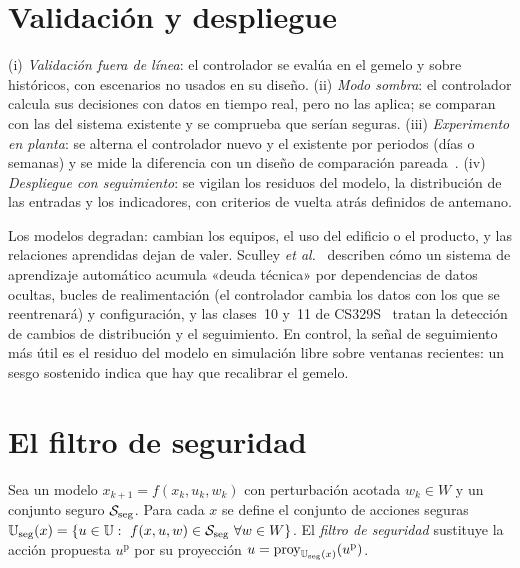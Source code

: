 \section{Validación y despliegue}

\begin{definicion}\label{def:validar}
(i) \emph{Validación fuera de línea}: el controlador se evalúa en el gemelo y sobre históricos, con escenarios no usados en su diseño. (ii) \emph{Modo sombra}: el controlador calcula sus decisiones con datos en tiempo real, pero no las aplica; se comparan con las del sistema existente y se comprueba que serían seguras. (iii) \emph{Experimento en planta}: se alterna el controlador nuevo y el existente por periodos (días o semanas) y se mide la diferencia con un diseño de comparación pareada~\cite[cap.~2]{montgomery}. (iv) \emph{Despliegue con seguimiento}: se vigilan los residuos del modelo, la distribución de las entradas y los indicadores, con criterios de vuelta atrás definidos de antemano.
\end{definicion}

\addtocounter{definicion}{1}%

Los modelos degradan: cambian los equipos, el uso del edificio o el producto, y las relaciones aprendidas dejan de valer. Sculley \emph{et al.}~\cite{sculley} describen cómo un sistema de aprendizaje automático acumula «deuda técnica» por dependencias de datos ocultas, bucles de realimentación (el controlador cambia los datos con los que se reentrenará) y configuración, y las clases~10 y~11 de CS329S~\cite{cs329s} tratan la detección de cambios de distribución y el seguimiento. En control, la señal de seguimiento más útil es el residuo del modelo en simulación libre sobre ventanas recientes: un sesgo sostenido indica que hay que recalibrar el gemelo.

\section{El filtro de seguridad}

\begin{definicion}\label{def:filtro}
Sea un modelo $x_{k+1}=f(x_k,u_k,w_k)$ con perturbación acotada $w_k\in W$ y un conjunto seguro $\mathcal{S}_{\mathrm{seg}}$. Para cada $x$ se define el conjunto de acciones seguras $\Uset_{\mathrm{seg}}(x)=\{u\in\Uset:\ f(x,u,w)\in\Sset_{\mathrm{seg}}\ \forall w\in W\}$. El \emph{filtro de seguridad} sustituye la acción propuesta $u^{\mathrm{p}}$ por su proyección $u=\operatorname{proy}_{\mathbb{U}_{\mathrm{seg}}(x)}(u^{\mathrm{p}})$.
\end{definicion}

